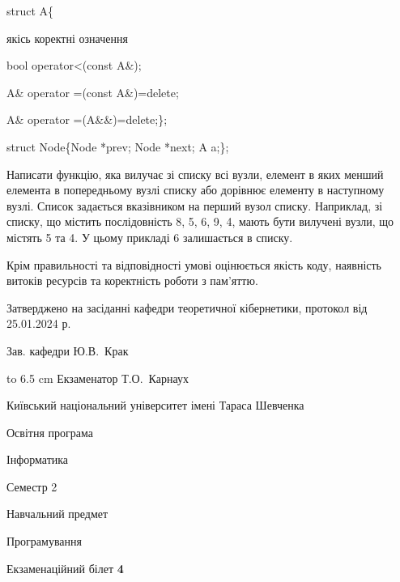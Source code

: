 \documentclass[12pt, ukrainian]{article}
\begin{document}
{struct A\{

\quad  якісь коректні означення 

\quad  bool operator<(const A\&); 

\quad A\& operator =(const A\&)=delete; 

\quad  A\& operator =(A\&\&)=delete;\};

struct Node\{Node *prev; Node *next; A a;\};

Написати функцію, яка вилучає зі списку всі вузли, елемент в яких менший елемента в попередньому вузлі списку або дорівнює елементу в наступному вузлі. Список задається вказівником на перший вузол списку. Наприклад, зі списку, що містить послідовність 8, 5, 6, 9, 4, мають бути вилучені вузли, що містять 5 та 4. У цьому прикладі 6 залишається в списку.

Крім правильності та відповідності умові оцінюється якість коду, наявність витоків ресурсів та коректність роботи з пам'яттю. 

}
{\smallskip\smallskip \begin {scriptsize} Затверджено на засіданні кафедри теоретичної кібернетики, протокол   від   25.01.2024 р.\par\smallskip\smallskip\smallskip\smallskip
{\parbox {6.5 cm} {Зав. кафедри \dotfill Ю.В.~Крак}}\hspace {0.7cm} {\hbox to 6.5 cm { Екзаменатор \dotfill Т.О.~Карнаух}} \end{scriptsize}}
\newpage
{{\begin {scriptsize}\par
{ \center  Київський національний університет імені Тараса Шевченка \par}
{\parbox {5 cm}{Освітня програма \hfill}{\parbox {7 cm}{Інформатика\hfill}}\parbox {6 cm}{\hfill Семестр 2}}\par
{\parbox {5 cm} {Навчальний предмет \hfill}\parbox {7 cm}{Програмування \hfill}\parbox {6cm}{\hfill}\par}\vspace{-15pt} \end{scriptsize}}{\center Екзаменаційний білет \No \textbf { 4 }\par}}
\end{document}

